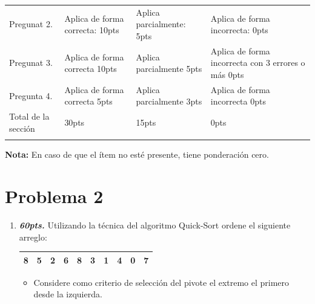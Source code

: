 \documentclass{exam}
\begin{document}
\begin{enumerate}
\begin{table}[H]
\begin{tabular}{
    !{\color{gray!50}\vrule}p{3.9cm}
    !{\color{gray!50}\vrule}p{3.6cm}
    !{\color{gray!50}\vrule}p{3.6cm}
    !{\color{gray!50}\vrule}p{3.6cm}
    !{\color{gray!50}\vrule}}
    Pregunat 2. &
    Aplica de forma correcta: 10pts   &
    Aplica parcialmente: 5pts  &
    Aplica de forma incorrecta: 0pts \\  \hline

    Pregunat 3. &
    Aplica de forma correcta 10pts   &
    Aplica parcialmente 5pts &
    Aplica de forma incorrecta con 3 errores o más 0pts\\  \hline

    Pregunta 4. &
    Aplica de forma correcta 5pts &
    Aplica parcialmente  3pts &
    Aplica de forma incorrecta  0pts\\  \hline

    Total de la sección &  30pts & 15pts & 0pts\\  \hline
  \end{tabular}
  \label{tbl:1}
\end{table}

\vspace{-5mm} \textbf{Nota:} En caso de que el ítem no esté presente,
tiene ponderación cero.



\newpage
\vspace{-7mm}
\section{\textbf{Problema 2}}
\noindent

\begin{questions}

  \begin{enumerate}
  \item \textbf{\emph{60pts.}} Utilizando la técnica del algoritmo Quick-Sort ordene el siguiente arreglo:

  \begin{table}[H]
  \centering
  \begin{tabular}{|l|l|l|l|l|l|l|l|l|l|}
  \hline
    8 & 5 & 2 & 6 & 8 & 3 & 1 & 4 & 0 & 7 \\
  \hline
  \end{tabular}
  \end{table}


\begin{itemize}
  \item Considere como criterio de selección del pivote el extremo el primero desde la izquierda.
\end{itemize}


\end{enumerate}
\end{questions}
\end{enumerate}
\end{document}
